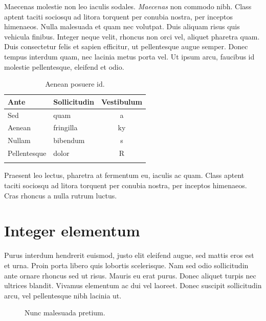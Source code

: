 Maecenas molestie non leo iaculis sodales. \emph{Maecenas} non commodo nibh. Class aptent taciti sociosqu ad litora torquent per conubia nostra, per inceptos himenaeos. Nulla malesuada et quam nec volutpat. Duis aliquam risus quis vehicula finibus. Integer neque velit, rhoncus non orci vel, aliquet pharetra quam. Duis consectetur felis et sapien efficitur, ut pellentesque augue semper. Donec tempus interdum quam, nec lacinia metus porta vel. Ut ipsum arcu, faucibus id molestie pellentesque, eleifend et odio. \cite[p.~86]{doloremIpsumQuia}

\begin{longtable}{l l c}
    \textbf{Ante} & \textbf{Sollicitudin} & \textbf{Vestibulum} \\
    \midrule
    Sed & quam & a \\
    Aenean & fringilla & ky \\
    Nullam & bibendum & s \\
    Pellentesque & dolor & R \\
    \caption{Aenean posuere id. } \\
\end{longtable}

Praesent leo lectus, pharetra at fermentum eu, iaculis ac quam. Class aptent taciti sociosqu ad litora torquent per conubia nostra, per inceptos himenaeos. Cras rhoncus a nulla rutrum luctus.

\section{Integer elementum}

Purus interdum hendrerit euismod, justo elit eleifend augue, sed mattis eros est et urna. Proin porta libero quis lobortis scelerisque. Nam sed odio sollicitudin ante ornare rhoncus sed ut risus. Mauris eu erat purus. Donec aliquet turpis nec ultrices blandit. Vivamus elementum ac dui vel laoreet. Donec suscipit sollicitudin arcu, vel pellentesque nibh lacinia ut.

\begin{figure}[!h]
    \centering

    \caption{Nunc malesuada pretium.}
\end{figure}

